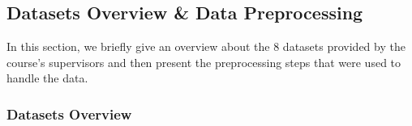 \documentclass[
]{article}
\begin{document}
\hypertarget{datasets-overview-data-preprocessing}{%
\subsection{Datasets Overview \& Data Preprocessing}\label{datasets-overview-data-preprocessing}}

In this section, we briefly give an overview about the 8 datasets provided by the course's supervisors and then present the preprocessing steps that were used to handle the data.

\hypertarget{datasets-overview}{%
\subsubsection{Datasets Overview}\label{datasets-overview}}
\end{document}
